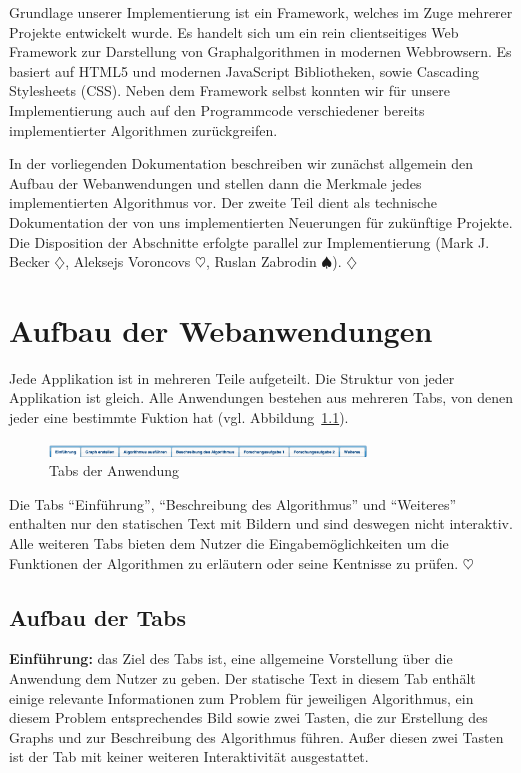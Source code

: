 Grundlage unserer Implementierung ist ein Framework, welches im Zuge mehrerer Projekte entwickelt wurde. Es handelt sich um ein rein clientseitiges Web Framework zur Darstellung von Graphalgorithmen in modernen Webbrowsern. Es basiert auf HTML5 und modernen Java\-Script Bibliotheken, sowie Cascading Stylesheets (CSS). Neben dem Framework selbst konnten wir für unsere Implementierung auch auf den Programmcode verschiedener bereits implementierter Algorithmen zurückgreifen.

In der vorliegenden Dokumentation beschreiben wir zunächst allgemein den Aufbau der Webanwendungen und stellen dann die Merkmale jedes implementierten Algorithmus vor. Der zweite Teil dient als technische Dokumentation der von uns implementierten Neuerungen für zukünftige Projekte. Die Disposition der Abschnitte erfolgte parallel zur Implementierung (Mark J. Becker $\diamondsuit$, Aleksejs Voroncovs $\heartsuit$, Ruslan Zabrodin $\spadesuit$). \hfill$\diamondsuit$

\chapter{Aufbau der Webanwendungen} %
Jede Applikation ist in mehreren Teile aufgeteilt. Die Struktur von jeder Applikation ist gleich. Alle Anwendungen bestehen aus mehreren Tabs, von denen jeder eine bestimmte Fuktion hat (vgl. Abbildung~\ref{fig:tabs}).

\begin{figure}[h!]
	\centering
	\includegraphics[width=0.75\textwidth]{figures/tabs}
	\caption[Tabs der Anwendung]{Tabs der Anwendung}\label{fig:tabs}
\end{figure}

Die Tabs \enquote{Einführung}, \enquote{Beschreibung des Algorithmus} und \enquote{Weiteres} enthalten nur den statischen Text mit Bildern und sind deswegen nicht interaktiv. Alle weiteren Tabs bieten dem Nutzer die Eingabemöglichkeiten um die Funktionen der Algorithmen zu erläutern oder seine Kentnisse zu prüfen. \hfill$\heartsuit$

\section{Aufbau der Tabs} %
\textbf{Einführung:} das Ziel des Tabs ist, eine allgemeine Vorstellung über die Anwendung dem Nutzer zu geben. Der statische Text in diesem Tab enthält einige relevante Informationen zum Problem für jeweiligen Algorithmus, ein diesem Problem entsprechendes Bild sowie zwei Tasten, die zur Erstellung des Graphs und zur Beschreibung des Algorithmus führen. Außer diesen zwei Tasten ist der Tab mit keiner weiteren Interaktivität ausgestattet.

